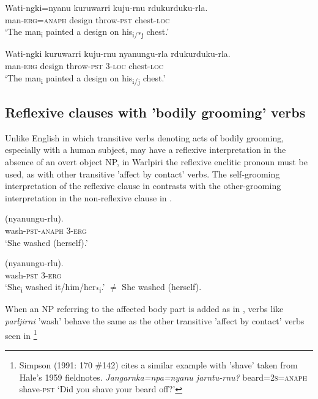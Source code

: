 \documentclass[output=paper]{../langscibook}
\begin{document}
\ea%
    \label{ex:laughren:25}
\ea
\label{ex:laughren:25a}
\gll  Wati-ngki=nyanu  kuruwarri  kuju-rnu  rdukurduku-rla. \\
    man\textsc{{}-erg=anaph}  design  throw-\textsc{pst}  chest-\textsc{loc}\\
\glt `The man\textsubscript{i} painted a design on his\textsubscript{i/*j} chest.'

\ex
\label{ex:laughren:25b}
\gll  Wati-ngki  kuruwarri  kuju-rnu  nyanungu-rla  rdukurduku-rla.\\
    man-\textsc{erg}  design  throw-\textsc{pst}  \textsc{3-loc}  chest-\textsc{loc}\\
\glt `The man\textsubscript{i} painted a design on his\textsubscript{i/j} chest.'

\z
\z


\subsection{Reflexive clauses with 'bodily grooming' verbs}\label{sec:laughren:3.4}

Unlike English in which transitive verbs denoting acts of bodily grooming, especially with a human subject, may have a reflexive interpretation in the absence of an overt object NP, in Warlpiri the reflexive enclitic pronoun must be used, as with other transitive 'affect by contact' verbs. The self-grooming interpretation of the reflexive clause in  contrasts with the other-grooming interpretation in the non-reflexive clause in .

\ea%
    \label{ex:laughren:26}
\ea
\label{ex:laughren:26a}
 ({nyanungu-rlu}).\\
    wash-\textsc{pst}{}-\textsc{anaph}  3-\textsc{erg}\\
\glt `She washed (herself).'

\ex
\label{ex:laughren:26b}
 ({nyanungu-rlu}).\\
    wash-\textsc{pst}  3-\textsc{erg}\\
  \glt `She\textsubscript{i} washed it/him/her\textsubscript{*i}.'
    ${\neq}$ She washed (herself).
    \z
\z


When an NP referring to the affected body part is added as in , verbs like \textit{parljirni} 'wash' behave the same as the other transitive 'affect by contact' verbs seen in \footnote{\textsuperscript{} Simpson (1991: 170 \#142) cites a similar example with 'shave' taken from Hale's 1959 fieldnotes.  \textit{Jangarnka=npa=nyanu   jarntu-rnu?}  beard=\textsc{2s=anaph}  shave-\textsc{pst} \glt `Did you shave your beard off?'}
\end{document}
